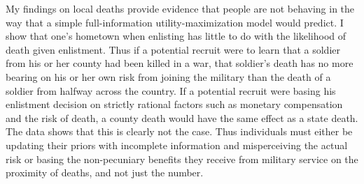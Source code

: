 \documentclass[12pt] {article}
\begin{document}


 

My findings on local deaths provide evidence that people
are not behaving in the way that a simple full-information utility-maximization
model would predict. I show that one's hometown when enlisting has
little to do with the likelihood of death given enlistment. Thus if
a potential recruit were to learn that a soldier from his or her
county had been killed in a war, that soldier's death has no more
bearing on his or her own risk from joining the military than the
death of a soldier from halfway across the country. If a potential
recruit were basing his enlistment decision on strictly rational factors such
as monetary compensation and the risk of death, a county death would
have the same effect as a state death. The data shows that this is
clearly not the case. Thus individuals must either be updating their
priors with incomplete information and misperceiving the actual risk
or basing the non-pecuniary benefits they receive from military service
on the proximity of deaths, and not just the number. 
\end{document}
